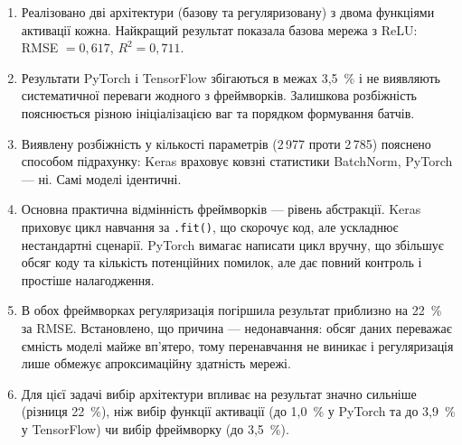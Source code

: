 \documentclass[14pt,a4paper]{extreport}
\begin{document}
\begin{enumerate}
\item Реалізовано дві архітектури (базову та регуляризовану) з двома функціями активації кожна. Найкращий результат показала базова мережа з ReLU: RMSE $= 0{,}617$, $R^2 = 0{,}711$.

\item Результати PyTorch і TensorFlow збігаються в межах 3,5~\% і не виявляють систематичної переваги жодного з фреймворків. Залишкова розбіжність пояснюється різною ініціалізацією ваг та порядком формування батчів.

\item Виявлену розбіжність у кількості параметрів (2\,977 проти 2\,785) пояснено способом підрахунку: Keras враховує ковзні статистики BatchNorm, PyTorch --- ні. Самі моделі ідентичні.

\item Основна практична відмінність фреймворків --- рівень абстракції. Keras приховує цикл навчання за \texttt{.fit()}, що скорочує код, але ускладнює нестандартні сценарії. PyTorch вимагає написати цикл вручну, що збільшує обсяг коду та кількість потенційних помилок, але дає повний контроль і простіше налагодження.

\item В обох фреймворках регуляризація погіршила результат приблизно на 22~\% за RMSE. Встановлено, що причина --- недонавчання: обсяг даних переважає ємність моделі майже вп'ятеро, тому перенавчання не виникає і регуляризація лише обмежує апроксимаційну здатність мережі.

\item Для цієї задачі вибір архітектури впливає на результат значно сильніше (різниця 22~\%), ніж вибір функції активації (до 1,0~\% у PyTorch та до 3,9~\% у TensorFlow) чи вибір фреймворку (до 3,5~\%).
\end{enumerate}
\end{document}
